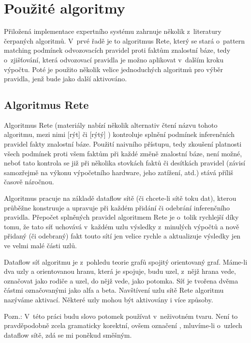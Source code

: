 \section{Použité algoritmy}
Přiložená implementace expertního systému zahrnuje několik z~literatury
čerpaných algoritmů. V~prvé řadě je to algoritmus Rete, který se stará o~pattern
matching podmínek odvozovacích pravidel proti faktům znalostní báze, tedy
o~zjišťování, která odvozovací pravidla je možno aplikovat v~dalším kroku výpočtu.
Poté je použito několik velice jednoduchých algoritmů pro výběr pravidla, jenž
bude jako další aktivováno.
\subsection{Algoritmus Rete}
Algoritmus Rete (materiály nabízí několik alternativ čtení názvu tohoto algoritmu,
mezi nimi  [rýt] či  [rýtý] \cite{doorenbos}) kontroluje
splnění podmínek inferenčních pravidel fakty znalostní báze. Použití naivního
přístupu, tedy zkoušení platnosti všech podmínek proti všem faktům při každé
změně znalostní báze, není možné, neboť tato kontrola se již při několika stovkách
faktů či desítkách pravidel (závisí samozřejmě na výkonu výpočetního hardware, jeho
zatížení, atd.) stává příliš časově náročnou.

Algoritmus pracuje na základě dataflow sítě (či chcete-li sítě toku dat),
kterou průběžne konstruuje a upravuje při každém přidání či odebrání
inferenčního pravidla. Přepočet splněných pravidel algoritmem Rete je o~tolik
rychlejší díky tomu, že tato síť uchovává v~každém uzlu výsledky z~minulých
výpočtů a nově přidaný (či odebraný) fakt touto sítí jen velice rychle
 a aktualizuje výsledky jen ve velmi malé části uzlů.

Dataflow síť algoritmu je z~pohledu teorie grafů spojitý orientovaný graf.
Máme-li dva uzly a orientovanou hranu, která je spojuje, budu uzel, z~nějž
hrana vede, označovat jako rodiče a uzel, do nějž vede, jako potomka.
Síť je tvořena dvěma částmi označovanými jako alfa a beta. Navštívení uzlu
sítě Rete algoritmu nazýváme aktivací. Některé uzly mohou být aktivovány
i více způsoby.

Pozn.: V~této práci budu slovo potomek používat v~neživotném tvaru. Není to
pravděpodobně zcela gramaticky korektní, ovšem označení ,
mluvíme-li o~uzlech dataflow sítě, zdá se mi poněkud směšným.

